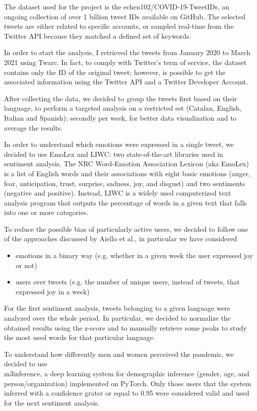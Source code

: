 The dataset used for the project is the echen102/COVID-19-TweetIDs, an ongoing collection of over 1 billion tweet IDs available on GitHub. The selected tweets are either related to specific accounts, or sampled real-time from the Twitter API because they matched a defined set of keywords.

In order to start the analysis, I retrieved the tweets from January 2020 to March 2021 using Twarc. In fact, to comply with Twitter's term of service, the dataset contains only the ID of the original tweet; however, is possible to get the associated information using the Twitter API and a Twitter Developer Account.

After collecting the data, we decided to group the tweets first based on their language, to perform a targeted analysis on a restricted set (Catalan, English, Italian and Spanish); secondly per week, for better data visualization and to average the results.

In order to understand which emotions were expressed in a single tweet, we decided to use EmoLex and LIWC: two state-of-the-art libraries used in sentiment analysis. The NRC Word-Emotion Association Lexicon (aka EmoLex) is a list of English words and their associations with eight basic emotions (anger, fear, anticipation, trust, surprise, sadness, joy, and disgust) and two sentiments (negative and positive). Instead, LIWC is a widely used computerized text analysis program that outputs the percentage of words in a given text that falls into one or more categories.

To reduce the possible bias of particularly active users, we decided to follow one of the approaches discussed by Aiello et al., in particular we have considered
	
\begin{itemize}
	\item emotions in a binary way (e.g. whether in a given week the user expressed joy or not)
	\item users over tweets (e.g. the number of unique users, instead of tweets, that expressed joy in a week)
\end{itemize}

For the first sentiment analysis, tweets belonging to a given language were analyzed over the whole period. In particular, we decided to normalize the obtained results using the z-score and to manually retrieve some peaks to study the most used words for that particular language.

To understand how differently men and women perceived the pandemic, we decided to use\\ m3inference, a deep learning system for demographic inference (gender, age, and person/organization) implemented on PyTorch. Only those users that the system inferred with a confidence grater or equal to 0.95 were considered valid and used for the next sentiment analysis.

